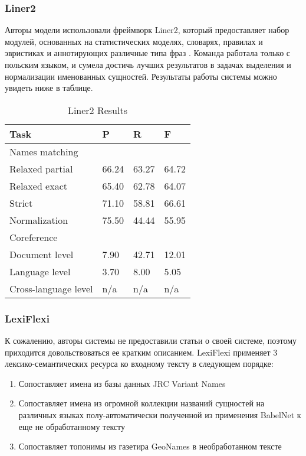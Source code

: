 \subsubsection{Liner2}

Авторы модели использовали фреймворк Liner2, который предоставляет набор модулей, основанных на статистических моделях, словарях, правилах и эвристиках и аннотирующих различные типа фраз \cite{marcinczuk-kocon-oleksy:2017:BSNLP}. Команда работала только с польским языком, и сумела достичь лучших результатов в задачах выделения и нормализации именованных сущностей. Результаты работы системы можно увидеть ниже в таблице.

\begin{table}[ht]
\centering
\caption{Liner2 Results}
\label{liner2}
\begin{tabular}{|l|l|l|l|}
\hline
Task                 & P     & R     & F     \\ \hline
Names matching       &       &       &       \\ \hline
Relaxed partial      & 66.24 & 63.27 & 64.72 \\ \hline
Relaxed exact        & 65.40 & 62.78 & 64.07 \\ \hline
Strict               & 71.10 & 58.81 & 66.61 \\ \hline
Normalization        & 75.50 & 44.44 & 55.95 \\ \hline
Coreference          &       &       &       \\ \hline
Document level       & 7.90  & 42.71 & 12.01 \\ \hline
Language level       & 3.70  & 8.00  & 5.05  \\ \hline
Cross-language level & n/a   & n/a   & n/a   \\ \hline
\end{tabular}
\end{table}

\subsubsection{LexiFlexi}

К сожалению, авторы системы не предоставили статьи о своей системе, поэтому приходится довольствоваться ее кратким описанием. LexiFlexi применяет 3 лексико-семантических ресурса ко входному тексту в следующем порядке:

\begin{enumerate}
    \item Сопоставляет имена из базы данных JRC Variant Names 
    \item Сопоставляет имена из огромной коллекции названий сущностей на различных языках полу-автоматически полученной из применения BabelNet к еще не обработанному тексту
    \item Сопоставляет топонимы из газетира GeoNames в необработанном тексте
\end{enumerate}

